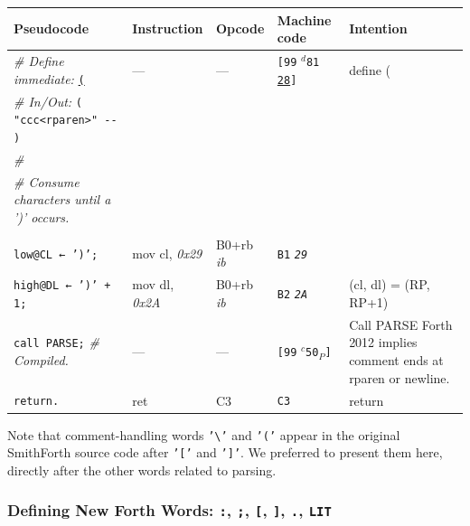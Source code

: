 \documentclass[a4paper,12pt,final]{article}
\begin{document}
\begin{table}[!htbp] \begin{adjustwidth}{-1cm}{-1cm} \fontsize{10}{12.000000}\selectfont
\begin{center}
\begin{tabular}{l|ll|lH}
\textbf{Pseudocode} & \textbf{Instruction} & \textbf{Opcode} & \textbf{Machine code} & \textbf{Intention}\\[0pt]
\hline
\emph{\# Define immediate:} \uline{\texttt{(}} & --- & --- & \texttt{[99} \(^{d}\)​\texttt{81} \uline{\texttt{28}}​\texttt{]} & define (\\[0pt]
\emph{\# In/Out:} \texttt{( "ccc<rparen>" -​- )} &  &  &  & \\[0pt]
\emph{\#} &  &  &  & \\[0pt]
\emph{\# Consume characters until a ')' occurs.} &  &  &  & \\[0pt]
 &  &  &  & \\[0pt]
\texttt{low@CL ← ')';} & mov cl, \emph{0x29} & B0+rb \emph{ib} & \texttt{B1} \emph{\texttt{29}} & \\[0pt]
\texttt{high@DL ← ')' + 1;} & mov dl, \emph{0x2A} & B0+rb \emph{ib} & \texttt{B2} \emph{\texttt{2A}} & (cl, dl) = (RP, RP+1)\\[0pt]
\texttt{call PARSE;}  \emph{\# Compiled.} & --- & --- & \texttt{[99} \(^{c}\)​\texttt{50}​\(_{P}\)​\texttt{]} & Call PARSE            Forth 2012 implies comment ends at rparen or newline.\\[0pt]
\texttt{return.} & ret & C3 & \texttt{C3} & return\\[0pt]
\end{tabular}

\end{center}
\normalsize \end{adjustwidth} \end{table} \vspace{0}

Note that comment-handling words \texttt{'\textbackslash{}'} and \texttt{'('} appear in the
original SmithForth source code after \texttt{'['} and \texttt{']'}.  We preferred
to present them here, directly after the other words related to
parsing.
\clearpage

\subsubsection{Defining New Forth Words: \texttt{:}, \texttt{;}, \texttt{[}, \texttt{]}, \texttt{.}, \texttt{LIT}}
\label{sec:org23d811c}
\end{document}
